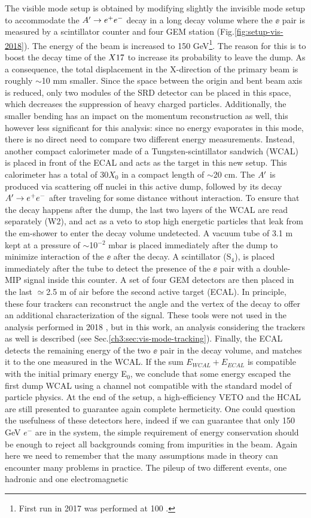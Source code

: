 The visible mode setup is obtained by modifying slightly the invisible mode setup to accommodate the $A' \to e^+e^-$ decay in a long decay volume where the $\ee$ pair is measured by a scintillator counter and four GEM station (Fig.\ref{fig:setup-vis-2018}). The energy of the beam is increased to 150 GeV\footnote{First run in 2017 was performed at 100 \gev.}. The reason for this is to boost the decay time of the $X17$ to increase its probability to leave the dump. As a consequence, the total displacement in the X-direction of the primary beam is roughly $\sim$10 \si{mm} smaller. Since the space between the origin and bent beam axis is reduced, only two modules of the SRD detector can be placed in this space, which decreases the suppression of heavy charged particles. Additionally, the smaller bending has an impact on the momentum reconstruction as well, this however less significant for this analysis: since no energy evaporates in this mode, there is no direct need to compare two different energy measurements. Instead, another compact calorimeter made of a Tungsten-scintillator sandwich (WCAL) is placed in front of the ECAL and acts as the target in this new setup. This calorimeter has a total of 30$X_0$ in a compact length of $\sim$20 \si{cm}. The $A'$ is produced via scattering off nuclei in this active dump, followed by its decay $A' \to e^+e^-$ after traveling for some distance without interaction. To ensure that the decay happens after the dump, the last two layers of the WCAL are read separately (W2), and act as a veto to stop high energetic particles that leak from the em-shower to enter the decay volume undetected. A vacuum tube of 3.1 \si{m} kept at a pressure of $\sim$10$^{-2}$ \si{mbar} is placed immediately after the dump to minimize interaction of the $\ee$ after the decay. A scintillator (S$_4$), is placed immediately after the tube to detect the presence of the $\ee$ pair with a double-MIP signal inside this counter. A set of four GEM detectors are then placed in the last $\simeq$2.5 \si{m} of air before the second active target (ECAL). In principle, these four trackers can reconstruct the angle and the vertex of the decay to offer an additional characterization of the signal. These tools were not used in the analysis performed in 2018 \cite{Banerjee:2019hmi}, but in this work, an analysis considering the trackers as well is described (see Sec.\ref{ch3:sec:vis-mode-tracking}). Finally, the ECAL detects the remaining energy of the two $\ee$ pair in the decay volume, and matches it to the one measured in the WCAL. If the sum $E_{WCAL}+E_{ECAL}$ is compatible with the initial primary energy E$_0$, we conclude that some energy escaped the first dump WCAL using a channel not compatible with the standard model of particle physics. At the end of the setup, a high-efficiency VETO and the HCAL are still presented to guarantee again complete hermeticity. One could question the usefulness of these detectors here, indeed if we can guarantee that only 150 GeV $e^-$ are in the system, the simple requirement of energy conservation should be enough to reject all backgrounds coming from impurities in the beam. Again here we need to remember that the many assumptions made in theory can encounter many problems in practice. The pileup of two different events, one hadronic and one electromagnetic 